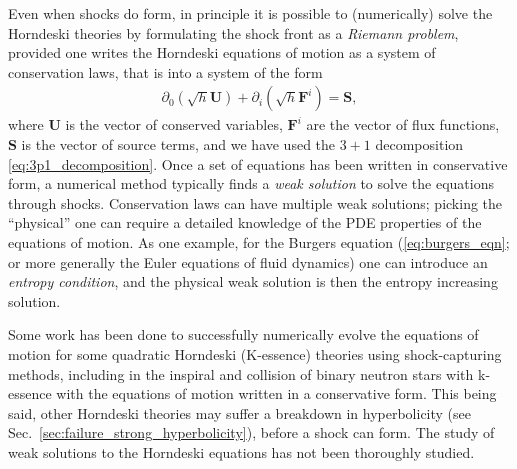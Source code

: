 \documentclass{ws-ijmpd}
\begin{document}
Even when shocks do form,
in principle it is possible to (numerically) 
solve the Horndeski theories by formulating the shock front as a 
\emph{Riemann problem}\cite{2013numerical,rezzolla2013relativistic}, 
provided one writes the Horndeski equations of motion 
as a system of conservation laws, that is into a system 
of the form\cite{rezzolla2013relativistic}
\begin{align}
   \partial_0\left(\sqrt{h}\textbf{U}\right)
   +
   \partial_i\left(\sqrt{h}\textbf{F}^i\right)
   =
   \textbf{S}
   ,
\end{align}
where $\textbf{U}$ is the vector of conserved variables, $\textbf{F}^i$
are the vector of flux functions, $\textbf{S}$ is the vector of
source terms, and
we have used the $3+1$ decomposition \eqref{eq:3p1_decomposition}.
Once a set of equations has been written in conservative form,
a numerical method typically finds a \emph{weak solution} to solve
the equations through shocks.
Conservation laws can have multiple weak solutions; picking the ``physical''
one can require a detailed knowledge of the PDE properties
of the equations of motion. As one example, for the Burgers
equation (\eqref{eq:burgers_eqn}; or more generally the Euler
equations of fluid dynamics) one can introduce an
\emph{entropy condition}, and the physical weak solution is then
the entropy increasing solution\cite{2013numerical}.

Some work has been done to successfully numerically evolve the 
equations of motion for some quadratic Horndeski (K-essence) theories 
using shock-capturing methods, including in the inspiral
and collision of binary neutron stars with k-essence with the
equations of motion written in a conservative form\cite{Bezares:2020wkn,
terHaar:2020xxb,Bezares:2021yek,Bezares:2021dma}.
This being said, other Horndeski theories may suffer a breakdown
in hyperbolicity 
(see Sec.~\ref{sec:failure_strong_hyperbolicity}),
before a shock can form.
The study of weak solutions to the Horndeski equations has not been
thoroughly studied.

\end{document}
